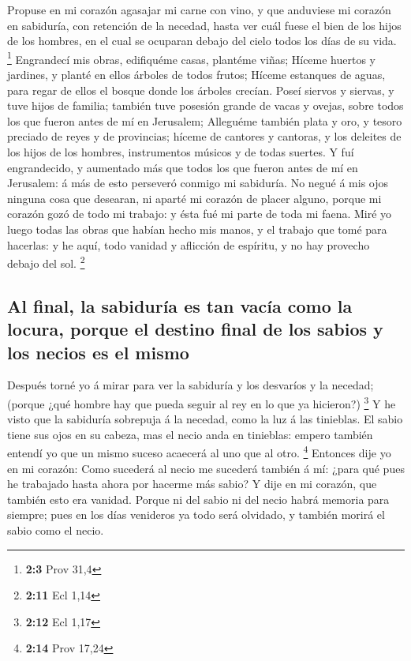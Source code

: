  Propuse en mi corazón agasajar mi carne con vino, y que
anduviese mi corazón en sabiduría, con retención de la necedad, hasta
ver cuál fuese el bien de los hijos de los hombres, en el cual se
ocuparan debajo del cielo todos los días de su vida. \footnote{\textbf{2:3}
  Prov 31,4}  Engrandecí mis obras, edifiquéme casas,
plantéme viñas;  Híceme huertos y jardines, y planté en
ellos árboles de todos frutos;  Híceme estanques de aguas,
para regar de ellos el bosque donde los árboles crecían. 
Poseí siervos y siervas, y tuve hijos de familia; también tuve posesión
grande de vacas y ovejas, sobre todos los que fueron antes de mí en
Jerusalem;  Alleguéme también plata y oro, y tesoro
preciado de reyes y de provincias; híceme de cantores y cantoras, y los
deleites de los hijos de los hombres, instrumentos músicos y de todas
suertes.  Y fuí engrandecido, y aumentado más que todos
los que fueron antes de mí en Jerusalem: á más de esto perseveró conmigo
mi sabiduría.  No negué á mis ojos ninguna cosa que
desearan, ni aparté mi corazón de placer alguno, porque mi corazón gozó
de todo mi trabajo: y ésta fué mi parte de toda mi faena.
 Miré yo luego todas las obras que habían hecho mis
manos, y el trabajo que tomé para hacerlas: y he aquí, todo vanidad y
aflicción de espíritu, y no hay provecho debajo del sol. \footnote{\textbf{2:11}
  Ecl 1,14}

\hypertarget{al-final-la-sabiduruxeda-es-tan-vacuxeda-como-la-locura-porque-el-destino-final-de-los-sabios-y-los-necios-es-el-mismo}{%
\subsection{Al final, la sabiduría es tan vacía como la locura, porque
el destino final de los sabios y los necios es el
mismo}\label{al-final-la-sabiduruxeda-es-tan-vacuxeda-como-la-locura-porque-el-destino-final-de-los-sabios-y-los-necios-es-el-mismo}}

 Después torné yo á mirar para ver la sabiduría y los
desvaríos y la necedad; (porque ¿qué hombre hay que pueda seguir al rey
en lo que ya hicieron?) \footnote{\textbf{2:12} Ecl 1,17}
 Y he visto que la sabiduría sobrepuja á la necedad, como
la luz á las tinieblas.  El sabio tiene sus ojos en su
cabeza, mas el necio anda en tinieblas: empero también entendí yo que un
mismo suceso acaecerá al uno que al otro. \footnote{\textbf{2:14} Prov
  17,24}  Entonces dije yo en mi corazón: Como sucederá
al necio me sucederá también á mí: ¿para qué pues he trabajado hasta
ahora por hacerme más sabio? Y dije en mi corazón, que también esto era
vanidad.  Porque ni del sabio ni del necio habrá memoria
para siempre; pues en los días venideros ya todo será olvidado, y
también morirá el sabio como el necio.

